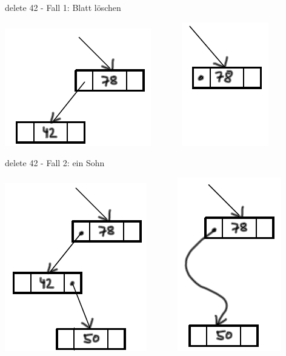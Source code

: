 \documentclass{beamer}
\begin{document}
\begin{frame}[fragile]
delete 42 - Fall 1: Blatt löschen   

\includegraphics[scale=0.6]{suchbaum8.png}  ~~~~~~  \pause 
\includegraphics[scale=0.6]{suchbaum9.png}    

delete 42 - Fall 2: ein Sohn  

\includegraphics[scale=0.6]{suchbaum10.png}  ~~~~~~  \pause 
\includegraphics[scale=0.6]{suchbaum11.png}  
 
\end{frame}
\end{document}
